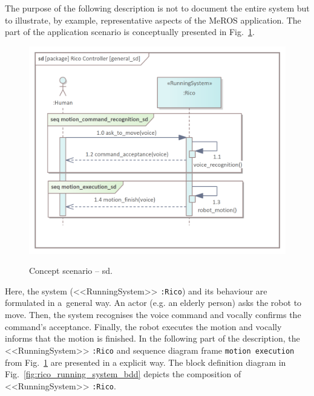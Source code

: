 \documentclass[11pt,oneside,a4paper]{article}
\begin{document}
	
	\pagebreak
	
	 The purpose of the following description is not to document the entire system but to illustrate, by example, representative aspects of the MeROS application.
		The part of the application scenario is conceptually presented in Fig.~\ref{fig:general_sd}.
	

	\begin{figure}[H] 
		\centering
		\begin{center}
			{\includegraphics[scale=0.9]{img/rico_pkg/general_sd.png}}
		\end{center}
		\caption{Concept scenario -- sd.} 
		\label{fig:general_sd}
	\end{figure}
	
	Here, the system (<<RunningSystem>> \texttt{:Rico}) and its behaviour are formulated in a~general way. An actor (e.g. an elderly person) asks the robot to move. Then, the system recognises the voice command and vocally confirms the command's acceptance. Finally, the robot executes the motion and vocally informs that the motion is finished.
	In the following part of the description, the <<RunningSystem>> \texttt{:Rico} and sequence diagram frame \texttt{motion execution} from Fig.~\ref{fig:general_sd} are presented in a explicit way.
	The block definition diagram in Fig.~\ref{fig:rico_running_system_bdd} depicts the composition of <<RunningSystem>> \texttt{:Rico}.
	
\end{document}
